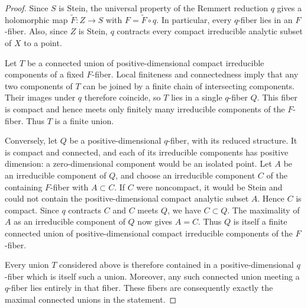 \documentclass[11pt]{amsart}
\theoremstyle{definition}
\theoremstyle{remark}
\numberwithin{equation}{section}
\begin{document}
\begin{proof}
Since $S$ is Stein, the universal property of the Remmert reduction $q$  gives a holomorphic map
$\widetilde F:Z\to S$ with $F=\widetilde F\circ q$.
In particular, every $q$-fiber lies in an $F$-fiber.
Also, since $Z$ is Stein, $q$ contracts every compact irreducible
analytic subset of $X$ to a point.

Let $T$ be a connected union of positive-dimensional compact
irreducible components of a fixed $F$-fiber.
Local finiteness and connectedness imply that any two components
of $T$ can be joined by a finite chain of intersecting components.
Their images under $q$ therefore coincide, so $T$ lies in a single
$q$-fiber $Q$. This fiber is compact and hence meets only finitely
many irreducible components of the $F$-fiber. Thus $T$ is a finite
union.

Conversely, let $Q$ be a positive-dimensional $q$-fiber, with its
reduced structure. It is compact and connected, and each of its
irreducible components has positive dimension: a zero-dimensional
component would be an isolated point. Let $A$ be an irreducible
component of $Q$, and choose an irreducible component $C$ of the
containing $F$-fiber with $A\subset C$.
If $C$ were noncompact, it would be Stein and could not contain
the positive-dimensional compact analytic subset $A$.
Hence $C$ is compact. Since $q$ contracts $C$ and $C$ meets $Q$,
we have $C\subset Q$. The maximality of $A$ as an irreducible
component of $Q$ now gives $A=C$.
Thus $Q$ is itself a finite connected union of positive-dimensional
compact irreducible components of the $F$-fiber.

Every union $T$ considered above is therefore contained in a
positive-dimensional $q$-fiber which is itself such a union.
Moreover, any such connected union meeting a $q$-fiber lies
entirely in that fiber. These fibers are consequently exactly
the maximal connected unions in the statement.
\end{proof}
\end{document}

